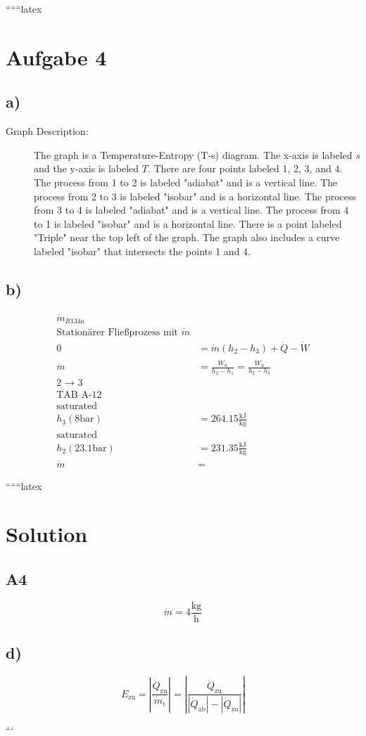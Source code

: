 
``````latex


\section*{Aufgabe 4}

\subsection*{a)}

\begin{description}
    \item[Graph Description:] The graph is a Temperature-Entropy (T-s) diagram. The x-axis is labeled $s$ and the y-axis is labeled $T$. There are four points labeled 1, 2, 3, and 4. The process from 1 to 2 is labeled "adiabat" and is a vertical line. The process from 2 to 3 is labeled "isobar" and is a horizontal line. The process from 3 to 4 is labeled "adiabat" and is a vertical line. The process from 4 to 1 is labeled "isobar" and is a horizontal line. There is a point labeled "Triple" near the top left of the graph. The graph also includes a curve labeled "isobar" that intersects the points 1 and 4.
\end{description}

\subsection*{b)}

\begin{align*}
    \dot{m}_{R134a} \\
    \text{Stationärer Fließprozess mit } \dot{m} \\
    0 &= \dot{m}(h_2 - h_3) + \dot{Q} - \dot{W} \\
    \dot{m} &= \frac{\dot{W}_u}{h_2 - h_1} = \frac{\dot{W}_u}{h_2 - h_3} \\
    \text{2 $\to$ 3} \\
    \text{TAB A-12} \\
    \text{saturated} \\
    h_3 (8 \text{bar}) &= 264.15 \frac{\text{kJ}}{\text{kg}} \\
    \text{saturated} \\
    h_2 (23.1 \text{bar}) &= 231.35 \frac{\text{kJ}}{\text{kg}} \\
    \dot{m} &= 
\end{align*}

``````latex

\section*{Solution}

\subsection*{A4}
\[
\dot{m} = 4 \frac{\text{kg}}{\text{h}}
\]

\subsection*{d)}
\[
E_{\text{zu}} = \left| \frac{\dot{Q}_{\text{zu}}}{\dot{m}_{\text{t}}} \right| = \left| \frac{\dot{Q}_{\text{zu}}}{\left| \dot{Q}_{\text{ab}} \right| - \left| \dot{Q}_{\text{zu}} \right|} \right|
\]

```